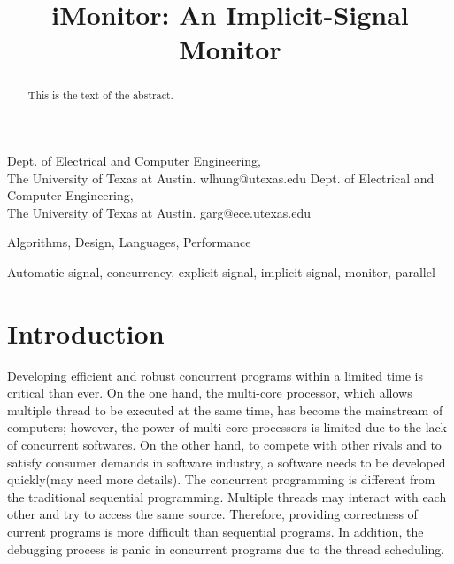 \documentclass[preprint]{sigplanconf}
\begin{document}
\copyrightdata{[to be supplied]} 


\title{iMonitor: An Implicit-Signal Monitor}
\subtitle{}

{Dept. of Electrical and Computer Engineering, \\ 
  The University of Texas at Austin.}
{wlhung@utexas.edu}
{Dept. of Electrical and Computer Engineering, \\ 
  The University of Texas at Austin.}
{garg@ece.utexas.edu}

\maketitle

\begin{abstract}
  This is the text of the abstract.
\end{abstract}


\terms
Algorithms, Design, Languages, Performance

\keywords
Automatic signal, concurrency, explicit signal, implicit signal,
monitor, parallel

\section{Introduction} \label{sec:intro}

Developing efficient and robust concurrent programs within a limited time is 
critical than ever. On the one hand, the multi-core processor, which allows 
multiple thread to be executed at the same time, has become the mainstream of 
computers; however, the power of multi-core processors is limited due to the 
lack of concurrent softwares. On the other hand, to compete with other rivals
and to satisfy consumer demands in software industry, a software needs to be 
developed quickly(may need more details). The concurrent programming is 
different from the traditional sequential programming. Multiple threads may 
interact with each other and try to access the same source. Therefore, providing
correctness of current programs is more difficult than sequential programs. In 
addition, the debugging process is panic in concurrent programs due to the 
thread scheduling. 
\end{document}
